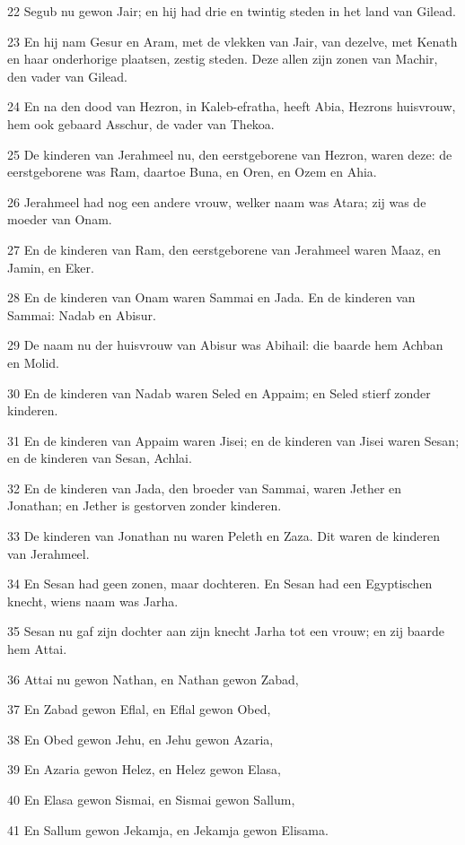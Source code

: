 \par 22 Segub nu gewon Jair; en hij had drie en twintig steden in het land van Gilead.
\par 23 En hij nam Gesur en Aram, met de vlekken van Jair, van dezelve, met Kenath en haar onderhorige plaatsen, zestig steden. Deze allen zijn zonen van Machir, den vader van Gilead.
\par 24 En na den dood van Hezron, in Kaleb-efratha, heeft Abia, Hezrons huisvrouw, hem ook gebaard Asschur, de vader van Thekoa.
\par 25 De kinderen van Jerahmeel nu, den eerstgeborene van Hezron, waren deze: de eerstgeborene was Ram, daartoe Buna, en Oren, en Ozem en Ahia.
\par 26 Jerahmeel had nog een andere vrouw, welker naam was Atara; zij was de moeder van Onam.
\par 27 En de kinderen van Ram, den eerstgeborene van Jerahmeel waren Maaz, en Jamin, en Eker.
\par 28 En de kinderen van Onam waren Sammai en Jada. En de kinderen van Sammai: Nadab en Abisur.
\par 29 De naam nu der huisvrouw van Abisur was Abihail: die baarde hem Achban en Molid.
\par 30 En de kinderen van Nadab waren Seled en Appaim; en Seled stierf zonder kinderen.
\par 31 En de kinderen van Appaim waren Jisei; en de kinderen van Jisei waren Sesan; en de kinderen van Sesan, Achlai.
\par 32 En de kinderen van Jada, den broeder van Sammai, waren Jether en Jonathan; en Jether is gestorven zonder kinderen.
\par 33 De kinderen van Jonathan nu waren Peleth en Zaza. Dit waren de kinderen van Jerahmeel.
\par 34 En Sesan had geen zonen, maar dochteren. En Sesan had een Egyptischen knecht, wiens naam was Jarha.
\par 35 Sesan nu gaf zijn dochter aan zijn knecht Jarha tot een vrouw; en zij baarde hem Attai.
\par 36 Attai nu gewon Nathan, en Nathan gewon Zabad,
\par 37 En Zabad gewon Eflal, en Eflal gewon Obed,
\par 38 En Obed gewon Jehu, en Jehu gewon Azaria,
\par 39 En Azaria gewon Helez, en Helez gewon Elasa,
\par 40 En Elasa gewon Sismai, en Sismai gewon Sallum,
\par 41 En Sallum gewon Jekamja, en Jekamja gewon Elisama.
